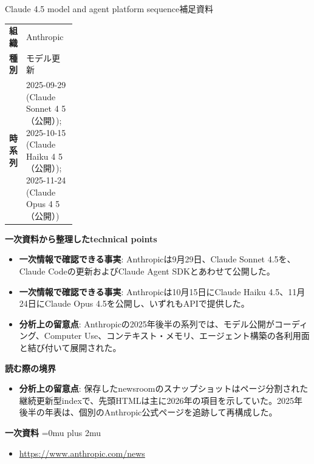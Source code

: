 \begin{technicalnote}{Claude 4.5 model and agent platform sequence}{補足資料}
\begingroup
\begin{tabularx}{\linewidth}{@{}>{\bfseries}p{0.22\linewidth}X@{}}
組織 & Anthropic \\
種別 & モデル更新 \\
時系列 & 2025-09-29 (Claude Sonnet 4 5（公開）); 2025-10-15 (Claude Haiku 4 5（公開）); 2025-11-24 (Claude Opus 4 5（公開）) \\
\end{tabularx}
\smallskip
{\bfseries 一次資料から整理したtechnical points}
\begin{itemize}[leftmargin=1.5em,itemsep=0.35em]
\item \textbf{一次情報で確認できる事実}: Anthropicは9月29日、Claude Sonnet 4.5を、Claude Codeの更新およびClaude Agent SDKとあわせて公開した。
\item \textbf{一次情報で確認できる事実}: Anthropicは10月15日にClaude Haiku 4.5、11月24日にClaude Opus 4.5を公開し、いずれもAPIで提供した。
\item \textbf{分析上の留意点}: Anthropicの2025年後半の系列では、モデル公開がコーディング、Computer Use、コンテキスト・メモリ、エージェント構築の各利用面と結び付いて展開された。
\end{itemize}
\begin{minipage}{\linewidth}
{\bfseries 読む際の境界}
\begin{itemize}[leftmargin=1.5em,itemsep=0.35em]
\item \textbf{分析上の留意点}: 保存したnewsroomのスナップショットはページ分割された継続更新型indexで、先頭HTMLは主に2026年の項目を示していた。2025年後半の年表は、個別のAnthropic公式ページを追跡して再構成した。
\end{itemize}
\begin{samepage}
{\bfseries 一次資料}
\begingroup\sloppy
\Urlmuskip=0mu plus 2mu\relax
\begin{itemize}[leftmargin=1.5em,itemsep=0.25em]
\item {\scriptsize\url{https://www.anthropic.com/news}}
\end{itemize}
\endgroup
\end{samepage}
\end{minipage}
\endgroup
\end{technicalnote}
\medskip

